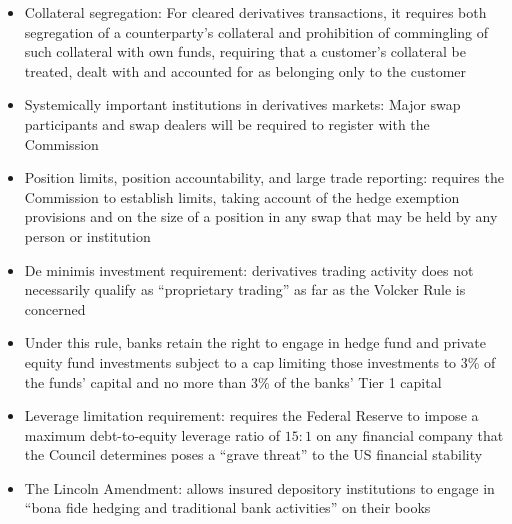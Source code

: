 \documentclass[11pt]{beamer}
\begin{document}
\begin{frame}
\begin{itemize}
\item Collateral segregation: For cleared derivatives transactions, it requires both segregation of a counterparty’s collateral and prohibition of commingling of such collateral with own funds, requiring that a customer’s collateral be treated, dealt with and accounted for as belonging only to the customer
\item Systemically important institutions in derivatives markets: Major swap participants and swap dealers will be required to register with the Commission
\item Position limits, position accountability, and large trade reporting: requires the Commission to establish limits, taking account of the hedge exemption provisions and on the size of a position in any swap that may be held by any person or institution
\item De minimis investment requirement: derivatives trading activity does not necessarily qualify as “proprietary trading” as far as the Volcker Rule is concerned
\end{itemize}
\end{frame}

\begin{frame}
\begin{itemize}
\item Under this rule, banks retain the right to engage in hedge fund and private equity fund investments subject to a cap limiting those investments to 3\% of the funds’ capital and no more than 3\% of the banks’ Tier 1 capital
\item Leverage limitation requirement: requires the Federal Reserve to impose a maximum debt-to-equity leverage ratio of $15:1$ on any financial company that the Council determines poses a “grave threat” to the US financial stability
\item The Lincoln Amendment: allows insured depository institutions to engage in “bona fide hedging and traditional bank activities” on their books
\end{itemize}
\end{frame}
\end{document}
